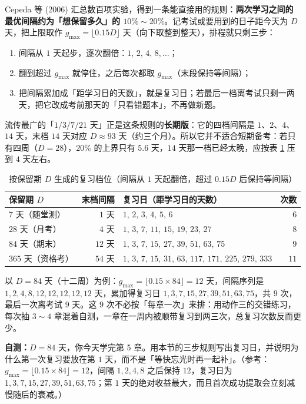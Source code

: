 Cepeda 等 (2006) 汇总数百项实验，得到一条能直接用的规则：\textbf{两次学习之间的最优间隔约为「想保留多久」的 $10\%\sim20\%$}。记考试或要用到的日子距今天为 $D$ 天，把上限取作 $g_{\max}=\lfloor0.15D\rfloor$ 天（向下取整到整天），排程就只剩三步：

\begin{enumerate}[nosep,leftmargin=1.6em]
\item 间隔从 $1$ 天起步，逐次翻倍：$1,\,2,\,4,\,8,\dots$；
\item 翻到超过 $g_{\max}$ 就停住，之后每次都取 $g_{\max}$（末段保持等间隔）；
\item 把间隔累加成「距学习日的天数」，就是复习日；若最后一档离考试只剩一两天，把它改成考前那天的「只看错题本」，不再做新题。
\end{enumerate}

流传最广的「$1/3/7/21$ 天」正是这条规则的\textbf{长期版}：它的四档间隔是 $1$、$2$、$4$、$14$ 天，末档 $14$ 天对应 $D\approx93$ 天（约三个月）。所以它并不适合短期备考：若只有四周（$D=28$），$20\%$ 的上界只有 $5.6$ 天，$14$ 天那一档已经太晚，应按表 \ref{tab:app-i-calendar} 压到 $4$ 天左右。

\begin{table}[htbp]
\centering
\caption{按保留期 $D$ 生成的复习档位（间隔从 $1$ 天起翻倍，超过 $0.15D$ 后保持等间隔）}
\label{tab:app-i-calendar}
\begin{tabular}{@{}p{3.1cm}rp{8.9cm}r@{}}
\toprule
保留期 $D$ & 末档间隔 & 复习日（距学习日的天数） & 次数 \\
\midrule
$7$ 天（随堂测） & $1$ 天 & $1,\,2,\,3,\,4,\,5,\,6$ & $6$ \\
$28$ 天（月考） & $4$ 天 & $1,\,3,\,7,\,11,\,15,\,19,\,23,\,27$ & $8$ \\
$84$ 天（期末） & $12$ 天 & $1,\,3,\,7,\,15,\,27,\,39,\,51,\,63,\,75$ & $9$ \\
$365$ 天（资格考） & $54$ 天 & $1,\,3,\,7,\,15,\,31,\,63,\,117,\,171,\,225,\,279,\,333$ & $11$ \\
\bottomrule
\end{tabular}
\end{table}

以 $D=84$ 天（十二周）为例：$g_{\max}=\lfloor0.15\times84\rfloor=12$ 天，间隔序列是 $1,2,4,8,12,12,12,12,12$ 天，累加得复习日 $1,3,7,15,27,39,51,63,75$，共 $9$ 次，最后一次离考试 $9$ 天。这 $9$ 次不必按「每章一次」来排：用动作三的交错练习，每次抽 $3\sim4$ 章混着自测，一章在一周内被顺带复习到两三次，总复习次数反而更少。

\begin{miniquiz}
\textbf{自测：}$D=84$ 天，你今天学完第 5 章。用本节的三步规则写出复习日，并说明为什么第一次复习要放在第 $1$ 天，而不是「等快忘光时再一起补」。（参考：$g_{\max}=\lfloor0.15\times84\rfloor=12$，间隔 $1,2,4,8$ 之后保持 $12$，复习日为 $1,3,7,15,27,39,51,63,75$；第 $1$ 天的绝对收益最大，而且首次成功提取会立刻减慢随后的衰减。）
\end{miniquiz}

